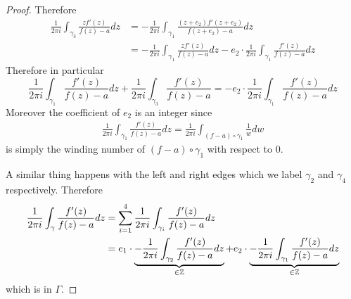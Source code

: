 \begin{proof}
    Therefore 
    \begin{align*}
        \frac{1}{2\pi i} \int_{\gamma_3} \frac{z f'(z)}{f(z) - a}dz &= -\frac{1}{2\pi i} \int_{\gamma_1} \frac{(z + e_2)f'(z + e_2)}{f(z + e_2) - a} dz\\ 
        &= -\frac{1}{2\pi i} \int_{\gamma_1}\frac{z f'(z)}{f(z) - a}dz - e_2 \cdot \frac{1}{2\pi i} \int_{\gamma_1} \frac{f'(z)}{f(z) - a} dz
    \end{align*}
    Therefore in particular
    $$ \frac{1}{2\pi i}\int_{\gamma_1} \frac{f'(z)}{f(z) - a} dz + \frac{1}{2\pi i} \int_{\gamma_3} \frac{f'(z)}{f(z) - a} = -e_2 \cdot \frac{1}{2\pi i}\int_{\gamma_1} \frac{f'(z)}{f(z) - a} dz$$
    Moreover the coefficient of $e_2$ is an integer since 
    \begin{align*}
        \frac{1}{2\pi i}\int_{\gamma_1} \frac{f'(z)}{f(z) - a} dz = \frac{1}{2\pi i}\int_{(f - a) \circ \gamma_1} \frac{1}{w} dw
    \end{align*}
    is simply the winding number of $(f - a) \circ \gamma_1$ with respect to 0.

    A similar thing happens with the left and right edges which we label $\gamma_2$ and $\gamma_4$ respectively. Therefore 
    \begin{align*}
        \frac{1}{2\pi i} \int_{\gamma} \frac{f'(z)}{f(z) - a} dz &= \sum_{i = 1}^4 \frac{1}{2\pi i} \int_{\gamma_i} \frac{f'(z)}{f(z) - a} dz\\
        &= e_1 \cdot \underbrace{-\frac{1}{2\pi i} \int_{\gamma_2} \frac{f'(z)}{f(z) - a} dz}_{\in \mathbb{Z}} + e_2 \cdot \underbrace{-\frac{1}{2\pi i} \int_{\gamma_1} \frac{f'(z)}{f(z) - a} dz}_{\in \mathbb{Z}}
    \end{align*}
    which is in $\Gamma$. 
\end{proof}

